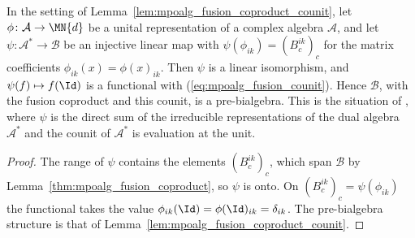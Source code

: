\begin{lemma}%
    \label{lem:mpoalg_fusion_counit_unital_representation}
    \leanok
    In the setting of Lemma~\ref{lem:mpoalg_fusion_coproduct_counit}, let
    $\phi\colon\mathcal A\to\MN{d}$ be a unital representation of a complex
    algebra $\mathcal A$, and let $\psi\colon\mathcal A^*\to\mathcal B$ be an
    injective linear map with $\psi(\phi_{ik})=(B_c^{ik})_c$ for the matrix
    coefficients $\phi_{ik}(x)=\phi(x)_{ik}$. Then $\psi$ is a linear
    isomorphism, and $\psi(f)\mapsto f(\Id)$ is a functional with
    (\ref{eq:mpoalg_fusion_counit}). Hence $\mathcal B$, with the fusion
    coproduct and this counit, is a pre-bialgebra. This is the situation of
    \cite[Section~4]{Molnar2022MPOAlgebrasI}, where $\psi$ is the direct sum
    of the irreducible representations of the dual algebra $\mathcal A^*$ and
    the counit of $\mathcal A^*$ is evaluation at the unit.
\end{lemma}

\begin{proof}
    \leanok
    The range of $\psi$ contains the elements $(B_c^{ik})_c$, which span
    $\mathcal B$ by Lemma~\ref{thm:mpoalg_fusion_coproduct}, so $\psi$ is
    onto. On $(B_c^{ik})_c=\psi(\phi_{ik})$ the functional takes the value
    $\phi_{ik}(\Id)=\phi(\Id)_{ik}=\delta_{ik}$. The pre-bialgebra structure
    is that of Lemma~\ref{lem:mpoalg_fusion_coproduct_counit}.
\end{proof}

